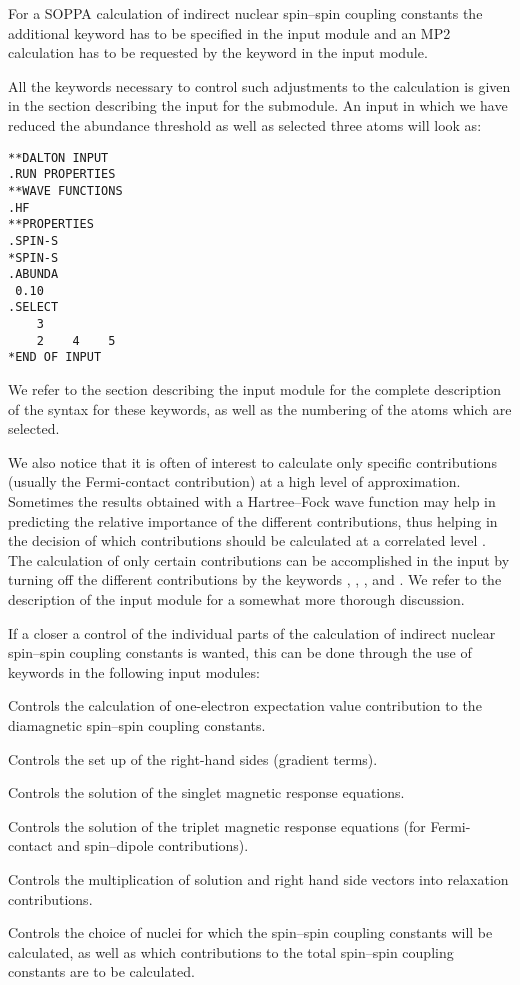For a SOPPA calculation of indirect nuclear spin--spin coupling 
constants the additional 
keyword  has to be specified in the  input module 
and an MP2 calculation has to be requested by the keyword  in the 
 input module. 

All the keywords necessary to control such adjustments to the
calculation is given in the section describing the input for the
 submodule. An input
in which we  have reduced the abundance threshold as well as
selected three atoms will look as:

\begin{verbatim}
**DALTON INPUT
.RUN PROPERTIES
**WAVE FUNCTIONS
.HF
**PROPERTIES
.SPIN-S
*SPIN-S
.ABUNDA
 0.10
.SELECT
    3
    2    4    5
*END OF INPUT
\end{verbatim}

We refer to the section describing the  input module for
the complete description of the syntax for these keywords, as well as
the numbering of the atoms which are selected.

We also notice that it is often of interest to calculate only specific
contributions (usually the Fermi-contact contribution) at a high level
of approximation. Sometimes the results obtained with a Hartree--Fock
wave function may help in predicting the relative importance of the different
contributions, thus helping in the decision of which contributions
should be calculated at a correlated level \cite{krthklbpjcpl226}.
The calculation of only certain contributions can be accomplished in
the input by turning off the different
contributions by the keywords , ,
, and . We refer to the description of the
 input module for a somewhat more thorough discussion.

If a closer a control of the individual parts of the calculation of
indirect nuclear spin--spin coupling constants is wanted, this can be
done through the use of keywords in the following input modules:

\begin{list}{}{\itemsep 0.10cm \parsep 0.0cm}
\item[\Sec{EXPECT}] Controls the calculation of one-electron
expectation value contribution to the diamagnetic spin--spin coupling
constants.
\item[\Sec{GETSGY}] Controls the set up of the right-hand sides
(gradient terms).
\item[\Sec{LINRES}] Controls the solution of the singlet magnetic
response equations.
\item[\Sec{TRPRSP}] Controls the solution of the triplet magnetic
response equations (for Fermi-contact and spin--dipole contributions).
\item[\Sec{RELAX}] Controls the multiplication of solution and right hand
side vectors into relaxation contributions.
\item[\Sec{SPIN-S}] Controls the choice of nuclei for which the
spin--spin coupling constants will be calculated, as well as which
contributions to the total spin--spin coupling constants are to be
calculated.
\end{list}

